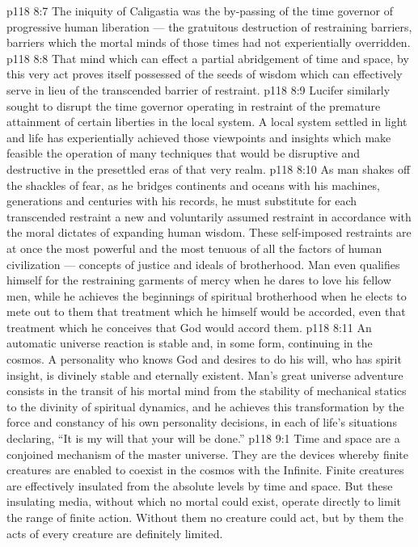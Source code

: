 \vs p118 8:7 The iniquity of Caligastia was the by\hyp{}passing of the time governor of progressive human liberation --- the gratuitous destruction of restraining barriers, barriers which the mortal minds of those times had not experientially overridden.
\vs p118 8:8 That mind which can effect a partial abridgement of time and space, by this very act proves itself possessed of the seeds of wisdom which can effectively serve in lieu of the transcended barrier of restraint.
\vs p118 8:9 Lucifer similarly sought to disrupt the time governor operating in restraint of the premature attainment of certain liberties in the local system. A local system settled in light and life has experientially achieved those viewpoints and insights which make feasible the operation of many techniques that would be disruptive and destructive in the presettled eras of that very realm.
\vs p118 8:10 As man shakes off the shackles of fear, as he bridges continents and oceans with his machines, generations and centuries with his records, he must substitute for each transcended restraint a new and voluntarily assumed restraint in accordance with the moral dictates of expanding human wisdom. These self\hyp{}imposed restraints are at once the most powerful and the most tenuous of all the factors of human civilization --- concepts of justice and ideals of brotherhood. Man even qualifies himself for the restraining garments of mercy when he dares to love his fellow men, while he achieves the beginnings of spiritual brotherhood when he elects to mete out to them that treatment which he himself would be accorded, even that treatment which he conceives that God would accord them.
\vs p118 8:11 An automatic universe reaction is stable and, in some form, continuing in the cosmos. A personality who knows God and desires to do his will, who has spirit insight, is divinely stable and eternally existent. Man’s great universe adventure consists in the transit of his mortal mind from the stability of mechanical statics to the divinity of spiritual dynamics, and he achieves this transformation by the force and constancy of his own personality decisions, in each of life’s situations declaring, “It is my will that your will be done.”
\vs p118 9:1 Time and space are a conjoined mechanism of the master universe. They are the devices whereby finite creatures are enabled to coexist in the cosmos with the Infinite. Finite creatures are effectively insulated from the absolute levels by time and space. But these insulating media, without which no mortal could exist, operate directly to limit the range of finite action. Without them no creature could act, but by them the acts of every creature are definitely limited.
